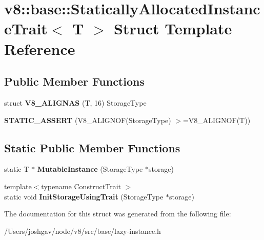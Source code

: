 \hypertarget{structv8_1_1base_1_1_statically_allocated_instance_trait}{}\section{v8\+:\+:base\+:\+:Statically\+Allocated\+Instance\+Trait$<$ T $>$ Struct Template Reference}
\label{structv8_1_1base_1_1_statically_allocated_instance_trait}
\subsection*{Public Member Functions}
\begin{DoxyCompactItemize}
\item 
struct {\bfseries V8\+\_\+\+A\+L\+I\+G\+N\+AS} (T, 16) Storage\+Type\hypertarget{structv8_1_1base_1_1_statically_allocated_instance_trait_ae4f9b79f40375ee33813be5d10f3ad33}{}\label{structv8_1_1base_1_1_statically_allocated_instance_trait_ae4f9b79f40375ee33813be5d10f3ad33}

\item 
{\bfseries S\+T\+A\+T\+I\+C\+\_\+\+A\+S\+S\+E\+RT} (V8\+\_\+\+A\+L\+I\+G\+N\+OF(Storage\+Type) $>$=V8\+\_\+\+A\+L\+I\+G\+N\+OF(T))\hypertarget{structv8_1_1base_1_1_statically_allocated_instance_trait_ad25dddd250e48cf9f14f47214253c2de}{}\label{structv8_1_1base_1_1_statically_allocated_instance_trait_ad25dddd250e48cf9f14f47214253c2de}

\end{DoxyCompactItemize}
\subsection*{Static Public Member Functions}
\begin{DoxyCompactItemize}
\item 
static T $\ast$ {\bfseries Mutable\+Instance} (Storage\+Type $\ast$storage)\hypertarget{structv8_1_1base_1_1_statically_allocated_instance_trait_a58f8bb54d3597d36e7063ead117276c9}{}\label{structv8_1_1base_1_1_statically_allocated_instance_trait_a58f8bb54d3597d36e7063ead117276c9}

\item 
{\footnotesize template$<$typename Construct\+Trait $>$ }\\static void {\bfseries Init\+Storage\+Using\+Trait} (Storage\+Type $\ast$storage)\hypertarget{structv8_1_1base_1_1_statically_allocated_instance_trait_a7490a549f3c89af617bd5aee7f8b70c6}{}\label{structv8_1_1base_1_1_statically_allocated_instance_trait_a7490a549f3c89af617bd5aee7f8b70c6}

\end{DoxyCompactItemize}


The documentation for this struct was generated from the following file\+:\begin{DoxyCompactItemize}
\item 
/\+Users/joshgav/node/v8/src/base/lazy-\/instance.\+h\end{DoxyCompactItemize}
